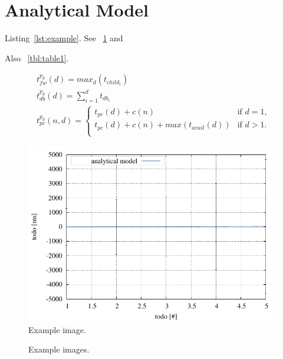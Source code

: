 \section{Analytical Model}\label{sec:analyze}

Listing~\ref{lst:example}.
See \figurename~\ref{fig:example1} and

Also \tablename~\ref{tbl:table1}.

\lstset{language=Java, caption=Example Code, %
label=lst:example, numbers=left, stepnumber=1}


\small
\begin{equation}
  \begin{array}{l}
    \displaystyle t^{p_d}_{fw}(d) = max_{d}(t_{child_{i}}) \\
    \displaystyle t^{p_d}_{db}(d) = \sum_{i=1}^{d} t_{db_{i}} \\
    \displaystyle t^{p_d}_{pc}(n,d) =
    	\begin{cases}
        	t_{pc}(d) + c(n) & \text{if $d = 1$,}\\
        	t_{pc}(d) + c(n) + max(t_{avail}(d)) & \text{if $d>1$.}\\
        \end{cases}
  \end{array}
  \label{eq:var_idb}
\end{equation}
\normalsize

\begin{figure}
    \centering
    \includegraphics[width=.45\textwidth]{resources/images/example1.pdf} 
    \caption{Example image.}
    \label{fig:example1}
\end{figure}

\begin{figure}
    \centering
    \caption{Example images.}
    \label{fig:exammple2_3}
\end{figure}

